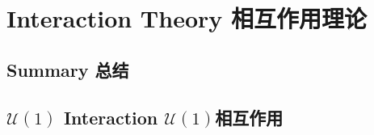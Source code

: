 
\newcommand\rd{\mathrm d}
\newcommand\ri{\mathrm i}

\chapter[相互作用理论]{Interaction Theory 相互作用理论}\label{chap7}

\section*{Summary 总结}

\section[U(1)相互作用]{$\mathcal{U}(1)$ Interaction $\mathcal{U}(1)$相互作用}